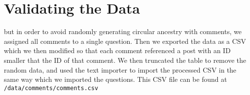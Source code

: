 \section{Validating the Data}

but in order to avoid randomly generating circular ancestry with comments, we assigned all comments to a single question. Then we exported the data as a CSV which we then modified so that each comment referenced a post with an ID smaller that the ID of that comment. We then truncated the table to remove the random data, and used the text importer to import the processed CSV in the same way which we imported the questions. This CSV file can be found at \verb`/data/comments/comments.csv`